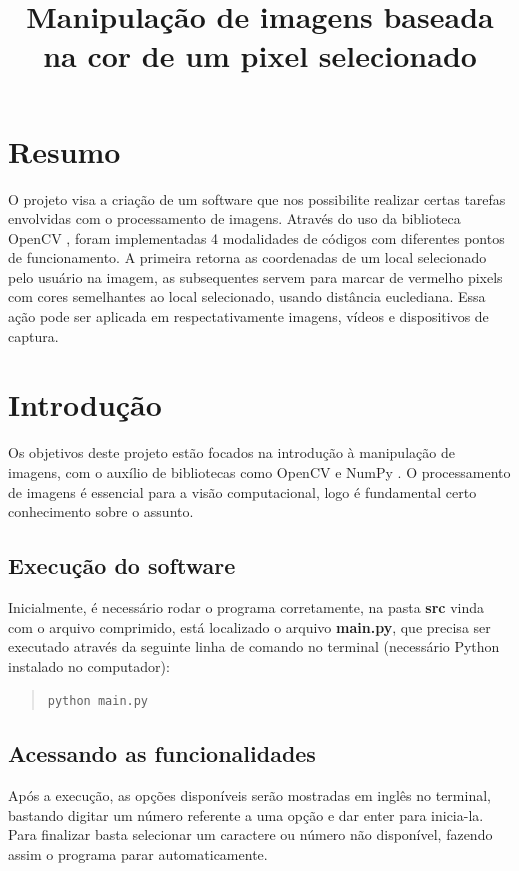 \documentclass{bmvc2k}
\title{Manipulação de imagens baseada\\na cor de um pixel selecionado}
\begin{document}
\maketitle
\section{Resumo}
\label{sec:intro}

O projeto visa a criação de um software que nos possibilite
realizar certas tarefas envolvidas com o processamento de imagens. Através
do uso da biblioteca OpenCV \cite{OpenCV}, foram implementadas 4 modalidades de códigos
com diferentes pontos de funcionamento. A primeira retorna as coordenadas
de um local selecionado pelo usuário na imagem, as subsequentes servem para
marcar de vermelho pixels com cores semelhantes ao local selecionado, 
usando distância euclediana. Essa ação pode ser aplicada em respectativamente 
imagens, vídeos e dispositivos de captura.
\section{Introdução}

Os objetivos deste projeto estão focados na introdução à manipulação de
imagens, com o auxílio de bibliotecas como OpenCV e NumPy \cite{scipy}. O processamento
de imagens é essencial para a visão computacional, logo é fundamental certo
conhecimento sobre o assunto. 

\subsection{Execução do software}
Inicialmente, é necessário rodar o programa corretamente, na pasta {\bf src} vinda
com o arquivo comprimido, está localizado o arquivo {\bf main.py}, que precisa ser executado
através da seguinte linha de comando no terminal (necessário Python instalado no computador):
\begin{quote}
    \tt{python main.py}
\end{quote}

\subsection{Acessando as funcionalidades}
Após a execução, as opções disponíveis serão mostradas em inglês no terminal, bastando
digitar um número referente a uma opção e dar enter para inicia-la. Para finalizar
basta selecionar um caractere ou número não disponível, fazendo assim o programa
parar automaticamente.
\end{document}
